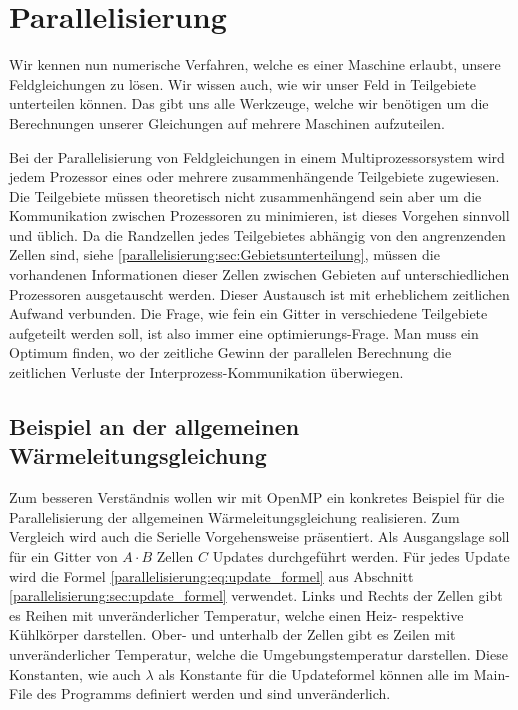 %
%
%
%
\section{Parallelisierung
	\label{parallelisierung:sec:Parallelisierung}}
Wir kennen nun numerische Verfahren, welche es einer Maschine erlaubt, unsere Feldgleichungen zu lösen.
Wir wissen auch, wie wir unser Feld in Teilgebiete unterteilen können.
Das gibt uns alle Werkzeuge, welche wir benötigen um die Berechnungen unserer Gleichungen auf mehrere Maschinen aufzuteilen.

Bei der Parallelisierung von Feldgleichungen in einem Multiprozessorsystem wird jedem Prozessor eines oder mehrere zusammenhängende Teilgebiete zugewiesen.
Die Teilgebiete müssen theoretisch nicht zusammenhängend sein aber um die Kommunikation zwischen Prozessoren zu minimieren, ist dieses Vorgehen sinnvoll und üblich.
Da die Randzellen jedes Teilgebietes abhängig von den angrenzenden Zellen sind, siehe \ref{parallelisierung:sec:Gebietsunterteilung}, müssen die vorhandenen Informationen dieser Zellen zwischen Gebieten auf unterschiedlichen Prozessoren ausgetauscht werden.
Dieser Austausch ist mit erheblichem zeitlichen Aufwand verbunden.
Die Frage, wie fein ein Gitter in verschiedene Teilgebiete aufgeteilt werden soll, ist also immer eine optimierungs-Frage.
Man muss ein Optimum finden, wo der zeitliche Gewinn der parallelen Berechnung die zeitlichen Verluste der Interprozess-Kommunikation überwiegen.




\subsection{Beispiel an der allgemeinen Wärmeleitungsgleichung
	\label{parallelisierung:sub:BeispielParallelisierung}}
Zum besseren Verständnis wollen wir mit OpenMP ein konkretes Beispiel für die Parallelisierung der allgemeinen Wärmeleitungsgleichung realisieren.
Zum Vergleich wird auch die Serielle Vorgehensweise präsentiert.
Als Ausgangslage soll für ein Gitter von $A \cdot B$ Zellen $C$ Updates durchgeführt werden.
Für jedes Update wird die Formel \ref{parallelisierung:eq:update_formel} aus Abschnitt \ref{parallelisierung:sec:update_formel} verwendet.
Links und Rechts der Zellen gibt es Reihen mit unveränderlicher Temperatur, welche einen Heiz- respektive Kühlkörper darstellen.
Ober- und unterhalb der Zellen gibt es Zeilen mit unveränderlicher Temperatur, welche die Umgebungstemperatur darstellen.
Diese Konstanten, wie auch $\lambda$ als Konstante für die Updateformel können alle im Main-File des Programms definiert werden und sind unveränderlich.

